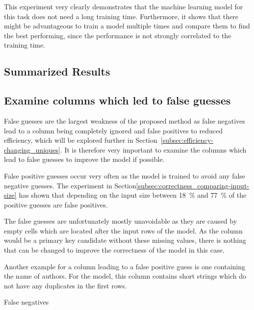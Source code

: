 This experiment very clearly demonstrates that the machine learning model for this task does not need a long training time. Furthermore, it shows that there might be advantageous to train a model multiple times and compare them to find the best performing, since the performance is not strongly correlated to the training time.






\subsection{Summarized Results}\label{subsec:correctness_conclusions} %


\subsection{Examine columns which led to false guesses}\label{subsec:correctness_examine-false-guesses} %
False guesses are the largest weakness of the proposed method as false negatives lead to a column being completely ignored and false positives to reduced efficiency, which will be explored further in Section~\ref{subsec:efficiency-changing_uniques}. It is therefore very important to examine the columns which lead to false guesses to improve the model if possible.

False positive guesses occur very often as the model is trained to avoid any false negative guesses. The experiment in Section\ref{subsec:correctness_comparing-input-size} has shown that depending on the input size between \SI{18}{\percent} and \SI{77}{\percent} of the positive guesses are false positives. %

The false guesses are unfortunately mostly unavoidable as they are caused by empty cells which are located after the input rows of the model. As the column would be a primary key candidate without these missing values, there is nothing that can be changed to improve the correctness of the model in this case.

Another example for a column leading to a false positive guess is one containing the name of authors. For the model, this column contains short strings which do not have any duplicates in the first rows. %

False negatives


